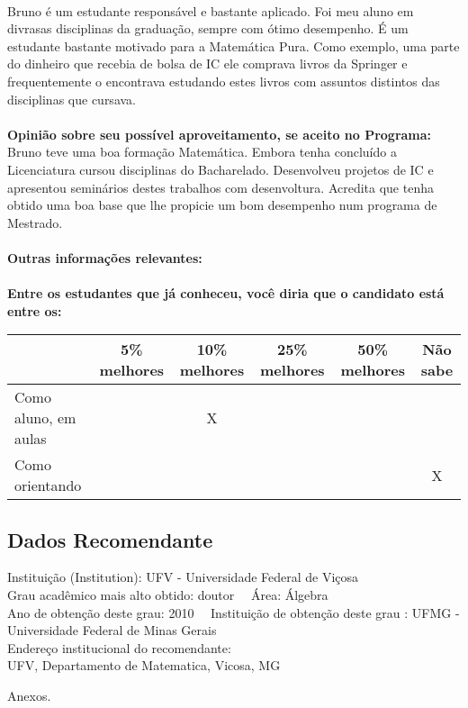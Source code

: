 \documentclass[11pt]{article}
\begin{document}
\\Bruno é um estudante responsável e bastante aplicado. Foi meu aluno em divrasas disciplinas da graduação, sempre com ótimo desempenho. É um estudante bastante motivado para a Matemática Pura. Como exemplo, uma parte do dinheiro que recebia de bolsa de IC ele comprava livros da Springer e frequentemente o encontrava estudando estes livros com assuntos distintos das disciplinas que cursava.\\
\\
\textbf{Opinião sobre seu possível aproveitamento, se aceito no Programa:}
\\Bruno teve uma boa formação Matemática. Embora tenha concluído a Licenciatura cursou disciplinas do Bacharelado. Desenvolveu projetos de IC e apresentou seminários destes trabalhos com desenvoltura. Acredita que tenha obtido uma boa base que lhe propicie um bom desempenho num programa de Mestrado.\\ 
\\
\textbf{Outras informações relevantes:} \\
\\[0.3cm]
\textbf{Entre os estudantes que já conheceu, você diria que o candidato está entre os:}
\\
\begin{tabular}{|l|c|c|c|c|c|}
\hline
 & 5\% melhores & 10\% melhores & 25\% melhores & 50\% melhores & Não sabe \\
\hline
Como aluno, em aulas &  & X &  &  & \\
\hline
Como orientando &  &  &  &  & X\\
\hline
\end{tabular}
\subsection*{Dados Recomendante} 
	Instituição (Institution): UFV - Universidade Federal de Viçosa
\\ 
	Grau acadêmico mais alto obtido: doutor
	\ \ Área: Álgebra
	\\
	Ano de obtenção deste grau: 2010
	\ \ 
	Instituição de obtenção deste grau : UFMG - Universidade Federal de Minas Gerais
	\\ 
	Endereço institucional do recomendante: \\ UFV, Departamento de Matematica, Vicosa, MG 
\begin{center}
Anexos.
\end{center}
\end{document}

